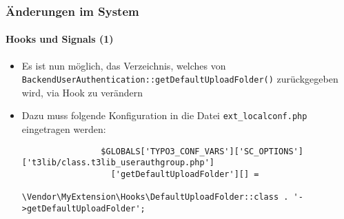 \begin{frame}[fragile]
	\frametitle{Änderungen im System}
	\framesubtitle{Hooks und Signals (1)}

	\lstset{basicstyle=\tiny\ttfamily}

	\begin{itemize}

		\item Es ist nun möglich, das Verzeichnis, welches von
			\texttt{BackendUserAuthentication::getDefaultUploadFolder()}
			zurückgegeben wird, via Hook zu verändern

		\item Dazu muss folgende Konfiguration in die Datei \texttt{ext\_localconf.php}
			eingetragen werden:

			\begin{lstlisting}
				$GLOBALS['TYPO3_CONF_VARS']['SC_OPTIONS']['t3lib/class.t3lib_userauthgroup.php']
				  ['getDefaultUploadFolder'][] =
				  \Vendor\MyExtension\Hooks\DefaultUploadFolder::class . '->getDefaultUploadFolder';
			\end{lstlisting}

	\end{itemize}

\end{frame}

